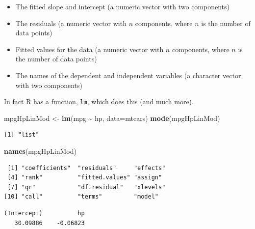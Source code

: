 \documentclass[
]{krantz}
\makeatletter
\newenvironment{Shaded}{\begin{snugshade}}{\end{snugshade}}
\newcommand{\DataTypeTok}[1]{\textcolor[rgb]{0.27,0.27,0.27}{#1}}
\newcommand{\KeywordTok}[1]{\textcolor[rgb]{0.27,0.27,0.27}{\textbf{#1}}}
\newcommand{\NormalTok}[1]{#1}
\newcommand{\OperatorTok}[1]{\textcolor[rgb]{0.43,0.43,0.43}{\textbf{#1}}}
\newcommand{\StringTok}[1]{\textcolor[rgb]{0.5,0.5,0.5}{#1}}
\providecommand{\tightlist}{%
  \setlength{\itemsep}{0pt}\setlength{\parskip}{0pt}}
\newenvironment{kframe}{%
\medskip{}
\setlength{\fboxsep}{.8em}
 \def\at@end@of@kframe{}%
 \ifinner\ifhmode%
  \def\at@end@of@kframe{\end{minipage}}%
  \begin{minipage}{\columnwidth}%
 \fi\fi%
 \def\FrameCommand##1{\hskip\@totalleftmargin \hskip-\fboxsep
 \colorbox{shadecolor}{##1}\hskip-\fboxsep
     \hskip-\linewidth \hskip-\@totalleftmargin \hskip\columnwidth}%
 \MakeFramed {\advance\hsize-\width
   \@totalleftmargin\z@ \linewidth\hsize
   \@setminipage}}%
 {\par\unskip\endMakeFramed%
 \at@end@of@kframe}
\renewenvironment{Shaded}{\begin{kframe}}{\end{kframe}}
\makeatother
\begin{document}
\begin{itemize}
\tightlist
\item
  The fitted slope and intercept (a numeric vector with two components)
\item
  The residuals (a numeric vector with \(n\) components, where \(n\) is the number of data points)
\item
  Fitted values for the data (a numeric vector with \(n\) components, where \(n\) is the number of data points)
\item
  The names of the dependent and independent variables (a character vector with two components)
\end{itemize}

In fact R has a function, \texttt{lm}, which does this (and much more).

\begin{Shaded}
\begin{Highlighting}[]
\NormalTok{mpgHpLinMod \textless{}{-}}\StringTok{ }\KeywordTok{lm}\NormalTok{(mpg }\OperatorTok{\textasciitilde{}}\StringTok{ }\NormalTok{hp, }\DataTypeTok{data=}\NormalTok{mtcars)}
\KeywordTok{mode}\NormalTok{(mpgHpLinMod)}
\end{Highlighting}
\end{Shaded}

\begin{verbatim}
[1] "list"
\end{verbatim}

\begin{Shaded}
\begin{Highlighting}[]
\KeywordTok{names}\NormalTok{(mpgHpLinMod)}
\end{Highlighting}
\end{Shaded}

\begin{verbatim}
 [1] "coefficients"  "residuals"     "effects"      
 [4] "rank"          "fitted.values" "assign"       
 [7] "qr"            "df.residual"   "xlevels"      
[10] "call"          "terms"         "model"        
\end{verbatim}

\begin{Shaded}
\end{Shaded}

\begin{verbatim}
(Intercept)          hp 
   30.09886    -0.06823 
\end{verbatim}
\end{document}
